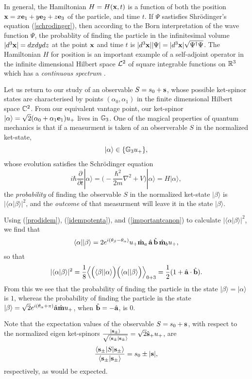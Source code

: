 \documentclass[]{article}
\begin{document}
In general, the Hamiltonian $H=H(\mathbf{x},t)$ is a function of both the position $\mathbf{x}=x \mathbf{e}_1+ y \mathbf{e}_2+z \mathbf{e}_3$ of the particle, and time $t$.
If $\Psi$ sastisfies Shr\"odinger's equation (\ref{schrodinger}), then according to the Born interpretation of the wave function $\Psi$,
the probablity of finding the particle in the infinitesimal volume $|d^3\mathbf{x}|=dx dy dz$ at the point $\mathbf{x}$ and time $t$ is
$|d^3\mathbf{x}||\Psi|= |d^3\mathbf{x}|\sqrt{\Psi^\dagger \Psi} $. The Hamiltonian $H$ for position is an important example of a self-adjoint operator in the 
infinite dimensional Hilbert space ${\cal L}^2$ of square integrable functions on $\mathbb{R}^3$ which has a {\it continuous spectrum} \cite[p.50,101,106]{G95}.

Let us return to our study of an observable $S=s_0+\mathbf{s}$, whose possible ket-spinor states are characterised
by points $(\alpha_0,\alpha_1)$ in the finite dimensional Hilbert space $\mathbb{C}^2$. From our equivalent
vantage point, our ket-spinor $|\alpha\rangle = \sqrt 2 (\alpha_0+ \alpha_1 \mathbf{e}_1)u_+$ lives in $\mathbb{G}_3$. One of 
the magical properties of quantum mechanics is that if a measurment is taken of an observerable $S$ in the normalized ket-state,
\[ |\alpha\rangle \in \{\mathbb{G}_3 u_+\} ,\]
whose evolution satisfies the Schr\"odinger equation
 \[ i\hbar \frac{\partial}{\partial t}|\alpha\rangle=\big(-\frac{\hbar^2}{2m} \nabla^2 + V\big)|\alpha\rangle = H|\alpha\rangle ,  \]
the {\it probability} of finding the observable $S$ in the normalized ket-state $|\beta\rangle $
is $|\langle \alpha |\beta \rangle|^2$, and the {\it outcome} of that measurment will leave it in the state $|\beta \rangle$.

Using (\ref{prodidem}), (\ref{idempotenta}), and (\ref{importantcanon}) to calculate $|\langle \alpha |\beta \rangle|^2$, we find that
\[ \langle \alpha | |\beta \rangle =2 e^{i(\theta_\beta -\theta_\alpha)} u_+ \hat {\mathbf{m}}_a\, \hat {\mathbf{a}}\, \hat {\mathbf{b}}\, \hat {\mathbf{m}}_b u_+,                   \]
so that
\[ |\langle \alpha |\beta \rangle|^2=\frac{1}{8} \Big\langle\Big(\langle \beta | |\alpha \rangle\Big) \Big( \langle \alpha | |\beta \rangle\Big)\Big\rangle_{0+3}
 =\frac{1}{2}(1+\hat{\mathbf{a}} \cdot \hat {\mathbf{b}}).  \]
From this we see that the probability of finding the particle in the state $|\beta \rangle=|\alpha \rangle$ is $1$,
whereas the probability of finding the particle in the state $|\beta \rangle = \sqrt 2 e^{i( \theta_\alpha +\pi)} \hat {\mathbf{a}} \hat {\mathbf{m}} u_+$, 
when $\hat {\mathbf{b}}=-\hat {\mathbf{a}}$, is $0$.
 
 Note that the expectation values of the observable $S=s_0+\mathbf{s}$, with respect to the normalized eigen ket-spinors 
 $\frac{|\mathbf{s}_\pm\rangle}{\sqrt{ \langle\mathbf{s}_\pm|\mathbf{s}_\pm\rangle}}      =\sqrt 2 \hat {\mathbf{s}}_+ u_+$, 
 are
 \[ \frac{ \langle \mathbf{s}_\pm | S | \mathbf{s}_\pm \rangle}{ \langle\mathbf{s}_\pm|\mathbf{s}_\pm\rangle} = s_0 \pm |\mathbf{s}|,  \]
 respectively, as would be expected. 
\end{document}
